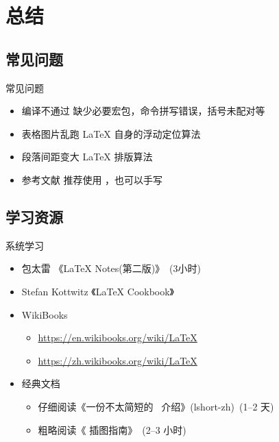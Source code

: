 \section{总结}

\subsection{常见问题}

\begin{frame}{常见问题}
  \begin{itemize}
    \item \alert{编译不通过} 缺少必要宏包，命令拼写错误，括号未配对等
    \item \alert{表格图片乱跑} \LaTeX{} 自身的浮动定位算法
    \item \alert{段落间距变大} \LaTeX{} 排版算法
    \item \alert{参考文献} 推荐使用 \BibTeX{}，也可以手写 
  \end{itemize}
\end{frame}

\subsection{学习资源}

\begin{frame}{系统学习}
  \begin{itemize}
      \item 包太雷 《\LaTeX{} Notes(第二版)》~(3小时)
      \item Stefan Kottwitz 《LaTeX Cookbook》
      \item WikiBooks
        \begin{itemize}
          \item \url{https://en.wikibooks.org/wiki/LaTeX}
          \item \url{https://zh.wikibooks.org/wiki/LaTeX}
        \end{itemize}
      \item 经典文档
        \begin{itemize}
          \item 仔细阅读《一份不太简短的~\LaTeXe{} 介绍》(lshort-zh)~(1--2 天)
          \item 粗略阅读《\LaTeXe{} 插图指南》~(2--3 小时)
        \end{itemize}
  \end{itemize}
\end{frame}

